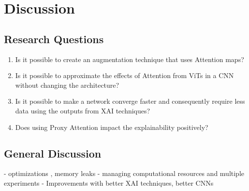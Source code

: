 \chapter{Discussion} \label{ch:discussion}
\section{Research Questions}
\begin{enumerate}
    \item Is it possible to create an augmentation technique that uses Attention maps?
    \item Is it possible to approximate the effects of Attention from ViTs in a CNN without changing the architecture?
    \item Is it possible to make a network converge faster and consequently require less data using the outputs from XAI techniques?
    \item Does using Proxy Attention impact the explainability positively?
\end{enumerate}

\section{General Discussion}
- optimizations , memory leaks
- managing computational resources and multiple experiments
- Improvements with better XAI techniques, better CNNs